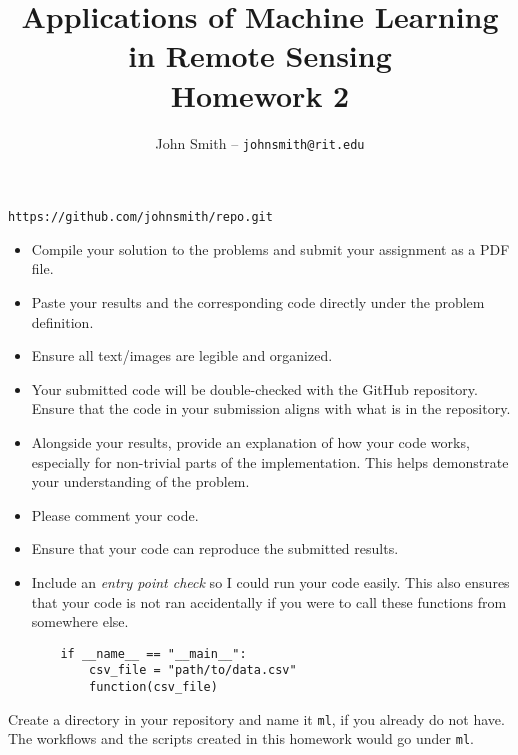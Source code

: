 \documentclass[12pt]{article}
\title{Applications of Machine Learning in Remote Sensing\\ Homework 2}
\date{\vspace{-5ex}}
\author{John Smith -- \texttt{johnsmith@rit.edu}}
\begin{document}
  \maketitle
\begin{center}
\texttt{https://github.com/johnsmith/repo.git}\\
\end{center}

\begin{itemize}

\item Compile your solution to the problems and submit your assignment as a PDF file.

\item Paste your results and the corresponding code directly under the problem definition.

\item Ensure all text/images are legible and organized.

\item Your submitted code will be double-checked with the GitHub repository. Ensure that the code in your submission aligns with what is in the repository.

\item Alongside your results, provide an explanation of how your code works, especially for non-trivial parts of the implementation. This helps demonstrate your understanding of the problem.

\item Please comment your code. 

\item Ensure that your code can reproduce the submitted results.

\item Include an \textit{entry point check} so I could run your code easily. This also ensures that your code is not ran accidentally if you were to call these functions from somewhere else. 

\begin{verbatim}
    if __name__ == "__main__":
        csv_file = "path/to/data.csv"
        function(csv_file)
\end{verbatim}


\end{itemize}


\newpage
\noindent Create a directory in your repository and name it \texttt{ml}, if you already do not have. The workflows and the scripts created in this homework would go under \texttt{ml}.\\
\end{document}
